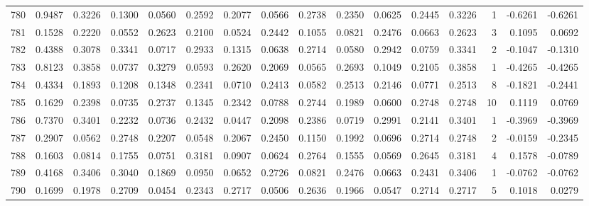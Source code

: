 \begin{tabular}{lrrrrrrrrrrrrrrr}
780 &      0.9487 &  0.3226 &  0.1300 &  0.0560 &  0.2592 &  0.2077 &  0.0566 &  0.2738 &  0.2350 &  0.0625 &   0.2445 &     0.3226 &      1 &                   -0.6261 &                    -0.6261 \\
781 &      0.1528 &  0.2220 &  0.0552 &  0.2623 &  0.2100 &  0.0524 &  0.2442 &  0.1055 &  0.0821 &  0.2476 &   0.0663 &     0.2623 &      3 &                    0.1095 &                     0.0692 \\
782 &      0.4388 &  0.3078 &  0.3341 &  0.0717 &  0.2933 &  0.1315 &  0.0638 &  0.2714 &  0.0580 &  0.2942 &   0.0759 &     0.3341 &      2 &                   -0.1047 &                    -0.1310 \\
783 &      0.8123 &  0.3858 &  0.0737 &  0.3279 &  0.0593 &  0.2620 &  0.2069 &  0.0565 &  0.2693 &  0.1049 &   0.2105 &     0.3858 &      1 &                   -0.4265 &                    -0.4265 \\
784 &      0.4334 &  0.1893 &  0.1208 &  0.1348 &  0.2341 &  0.0710 &  0.2413 &  0.0582 &  0.2513 &  0.2146 &   0.0771 &     0.2513 &      8 &                   -0.1821 &                    -0.2441 \\
785 &      0.1629 &  0.2398 &  0.0735 &  0.2737 &  0.1345 &  0.2342 &  0.0788 &  0.2744 &  0.1989 &  0.0600 &   0.2748 &     0.2748 &     10 &                    0.1119 &                     0.0769 \\
786 &      0.7370 &  0.3401 &  0.2232 &  0.0736 &  0.2432 &  0.0447 &  0.2098 &  0.2386 &  0.0719 &  0.2991 &   0.2141 &     0.3401 &      1 &                   -0.3969 &                    -0.3969 \\
787 &      0.2907 &  0.0562 &  0.2748 &  0.2207 &  0.0548 &  0.2067 &  0.2450 &  0.1150 &  0.1992 &  0.0696 &   0.2714 &     0.2748 &      2 &                   -0.0159 &                    -0.2345 \\
788 &      0.1603 &  0.0814 &  0.1755 &  0.0751 &  0.3181 &  0.0907 &  0.0624 &  0.2764 &  0.1555 &  0.0569 &   0.2645 &     0.3181 &      4 &                    0.1578 &                    -0.0789 \\
789 &      0.4168 &  0.3406 &  0.3040 &  0.1869 &  0.0950 &  0.0652 &  0.2726 &  0.0821 &  0.2476 &  0.0663 &   0.2431 &     0.3406 &      1 &                   -0.0762 &                    -0.0762 \\
790 &      0.1699 &  0.1978 &  0.2709 &  0.0454 &  0.2343 &  0.2717 &  0.0506 &  0.2636 &  0.1966 &  0.0547 &   0.2714 &     0.2717 &      5 &                    0.1018 &                     0.0279 \\

\end{tabular}
